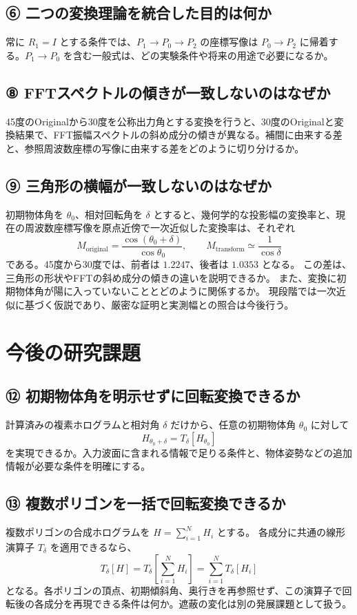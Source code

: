 \documentclass[a4paper,10pt]{ltjsarticle}
\begin{document}
\subsection*{⑥ 二つの変換理論を統合した目的は何か}
常に $R_1=I$ とする条件では、$P_1\to P_0\to P_2$ の座標写像は $P_0\to P_2$ に帰着する。$P_1\to P_0$ を含む一般式は、どの実験条件や将来の用途で必要になるか。

\subsection*{⑧ FFTスペクトルの傾きが一致しないのはなぜか}
45度のOriginalから30度を公称出力角とする変換を行うと、30度のOriginalと変換結果で、FFT振幅スペクトルの斜め成分の傾きが異なる。補間に由来する差と、参照周波数座標の写像に由来する差をどのように切り分けるか。

\subsection*{⑨ 三角形の横幅が一致しないのはなぜか}
初期物体角を $\theta_0$、相対回転角を $\delta$ とすると、幾何学的な投影幅の変換率と、現在の周波数座標写像を原点近傍で一次近似した変換率は、それぞれ
\[
 M_{\mathrm{original}}=\frac{\cos(\theta_0+\delta)}{\cos\theta_0},
 \qquad
 M_{\mathrm{transform}}\simeq\frac{1}{\cos\delta}
\]
である。45度から30度では、前者は $1.2247$、後者は $1.0353$ となる。
この差は、三角形の形状やFFTの斜め成分の傾きの違いを説明できるか。
また、変換に初期物体角が陽に入っていないこととどのように関係するか。
現段階では一次近似に基づく仮説であり、厳密な証明と実測幅との照合は今後行う。

\section{今後の研究課題}
\subsection*{⑫ 初期物体角を明示せずに回転変換できるか}
計算済みの複素ホログラムと相対角 $\delta$ だけから、任意の初期物体角 $\theta_0$ に対して
\[
 H_{\theta_0+\delta}=T_\delta[H_{\theta_0}]
\]
を実現できるか。入力波面に含まれる情報で足りる条件と、物体姿勢などの追加情報が必要な条件を明確にする。

\subsection*{⑬ 複数ポリゴンを一括で回転変換できるか}
複数ポリゴンの合成ホログラムを $H=\sum_{i=1}^{N}H_i$ とする。
各成分に共通の線形演算子 $T_\delta$ を適用できるなら、
\[
 T_\delta[H]
 =T_\delta\!\left[\sum_{i=1}^{N}H_i\right]
 =\sum_{i=1}^{N}T_\delta[H_i]
\]
となる。各ポリゴンの頂点、初期傾斜角、奥行きを再参照せず、この演算子で回転後の各成分を再現できる条件は何か。遮蔽の変化は別の発展課題として扱う。
\end{document}
